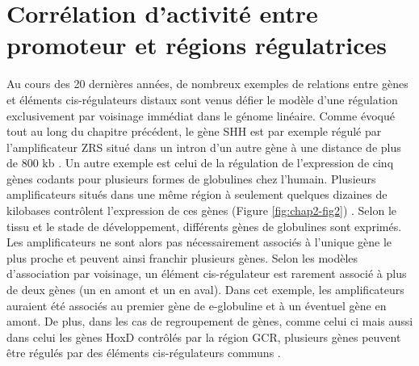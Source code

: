 \section{Corrélation d’activité entre promoteur et régions régulatrices}
\label{sec:correl-act}

Au cours des 20 dernières années, de nombreux exemples de relations entre gènes et éléments \gls{cis}-régulateurs distaux sont venus défier le modèle d’une régulation exclusivement par voisinage immédiat dans le génome linéaire. Comme évoqué tout au long du chapitre précédent, le gène \gls{SHH} est par exemple régulé par l’amplificateur \acrshort{ZRS} situé dans un intron d’un autre gène à une distance de plus de 800 kb \citep{lettice_long-range_2003}. Un autre exemple est celui de la régulation de l’expression de cinq gènes codants pour plusieurs formes de globulines chez l’humain. Plusieurs amplificateurs situés dans une même région à seulement quelques dizaines de kilobases contrôlent l’expression de ces gènes (Figure \ref{fig:chap2-fig2}) \citep{levings_human_2002}. Selon le tissu et le stade de développement, différents gènes de globulines sont exprimés. Les amplificateurs ne sont alors pas nécessairement associés à l’unique gène le plus proche et peuvent ainsi franchir plusieurs gènes. Selon les modèles d’association par voisinage, un élément \gls{cis}-régulateur est rarement associé à plus de deux gènes (un en amont et un en aval). Dans cet exemple, les amplificateurs auraient été associés au premier gène de e-globuline et à un éventuel gène en amont. De plus, dans les cas de regroupement de gènes, comme celui ci mais aussi dans celui les gènes HoxD contrôlés par la région GCR, plusieurs gènes peuvent être régulés par des éléments \gls{cis}-régulateurs communs \citep{spitz_global_2003}. 


